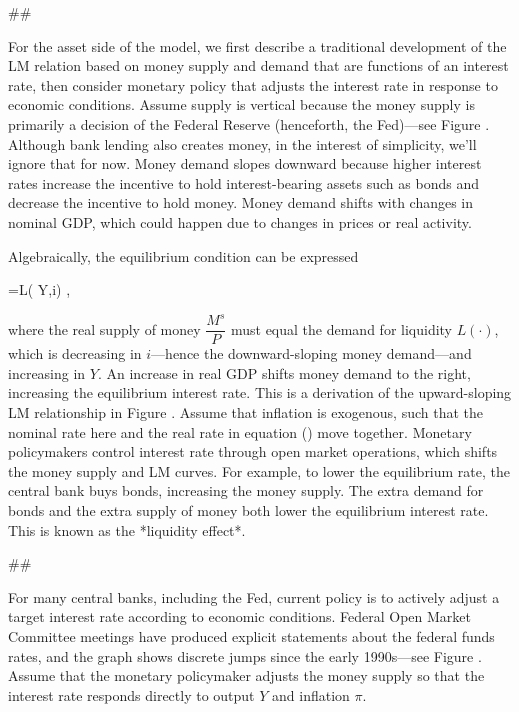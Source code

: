 ﻿\documentclass[oneside]{book}
\begin{document}
##



For the asset side of the model, we first describe a traditional development of the LM relation based on money supply and
demand that are functions of an interest rate, then consider monetary policy that adjusts the interest rate in response to economic conditions. Assume
supply is vertical because the money supply is primarily a decision of the
Federal Reserve (henceforth, the Fed)---see Figure . Although bank lending also creates money, in the
interest of simplicity, we'll ignore that for now.
Money demand slopes downward because higher interest rates increase the
incentive to hold interest-bearing assets such as bonds and decrease the incentive to
hold money. Money demand shifts with changes in nominal GDP, which could happen due to changes in prices or real activity.

Algebraically, the equilibrium condition can be expressed



=L( Y,i) ,


where the real supply of money $\dfrac{M^{s}}{P}$ must equal the demand for
liquidity $L( \cdot ) $, which is decreasing in $i$---hence the
downward-sloping money demand---and increasing in $Y$. An increase in real
GDP shifts money demand to the right, increasing the equilibrium interest
rate. This is a derivation of the upward-sloping LM relationship in Figure
. Assume that inflation is exogenous, such that the nominal rate here and
the real rate in equation () move together. Monetary policymakers control interest rate through open market operations, which shifts the money supply and LM curves. For example, to lower the equilibrium rate, the central bank buys bonds, increasing the money supply.  The extra demand for bonds and the extra supply of money both lower the equilibrium interest rate. This is known as the *liquidity effect*.



##



For many central banks, including the Fed, current policy is to actively adjust a target interest rate according to economic conditions. Federal Open Market Committee meetings have produced explicit statements about the federal funds rates,
and the graph shows discrete jumps since the early 1990s---see Figure .
Assume that the monetary policymaker adjusts the money supply so that the interest rate responds directly to output $Y$ and inflation $\pi .$
\end{document}
